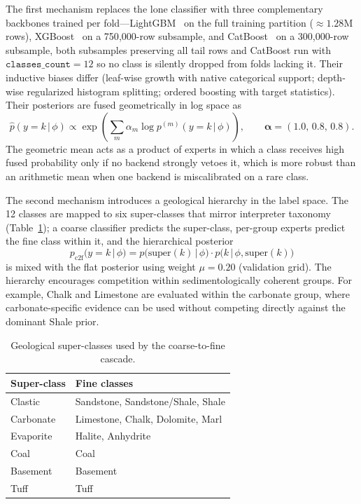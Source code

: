 \documentclass[bdcc,article,submit,pdftex,moreauthors]{Definitions/mdpi}
\begin{document}
The first mechanism replaces the lone classifier with three complementary backbones trained
per fold---LightGBM~\cite{ke2017lightgbm} on the full training partition ($\approx\!1.28$M rows),
XGBoost~\cite{chen2016xgboost} on a 750{,}000-row subsample, and
CatBoost~\cite{prokhorenkova2018catboost} on a 300{,}000-row subsample, both subsamples
preserving all tail rows and CatBoost run with $\texttt{classes\_count}=12$ so no class is
silently dropped from folds lacking it. Their inductive biases differ (leaf-wise growth with
native categorical support; depth-wise regularized histogram splitting; ordered boosting with
target statistics). Their posteriors are fused geometrically in log space as
\begin{equation}
\hat p(y=k\,|\,\phi)\propto\exp\!\left(\sum_m \alpha_m\log p^{(m)}(y=k\,|\,\phi)\right),\qquad
\boldsymbol\alpha=(1.0,\,0.8,\,0.8).
\label{eq:geomean}
\end{equation}
The geometric mean acts as a product of experts in which a class receives high fused probability only
if no backend strongly vetoes it, which is more robust than an arithmetic mean when one
backend is miscalibrated on a rare class.

The second mechanism introduces a geological hierarchy in the label space. The 12 classes are
mapped to six super-classes that mirror interpreter taxonomy (Table~\ref{tab:superclass}); a
coarse classifier predicts the super-class, per-group experts predict the fine class within it,
and the hierarchical posterior
\begin{equation}
p_\text{c2f}(y=k\,|\,\phi) = p\!\bigl(\text{super}(k)\,|\,\phi\bigr)\cdot p\!\bigl(k\,|\,\phi,\text{super}(k)\bigr)
\label{eq:c2f}
\end{equation}
is mixed with the flat posterior using weight $\mu=0.20$ (validation grid). The hierarchy
encourages competition within sedimentologically coherent groups. For example, Chalk and
Limestone are evaluated within the carbonate group, where carbonate-specific evidence can be
used without competing directly against the dominant Shale prior.

\begin{table}[H]
\caption{Geological super-classes used by the coarse-to-fine cascade.\label{tab:superclass}}
\begin{tabularx}{\textwidth}{lX}
\toprule
\textbf{Super-class} & \textbf{Fine classes}\\
\midrule
Clastic & Sandstone, Sandstone/Shale, Shale\\
Carbonate & Limestone, Chalk, Dolomite, Marl\\
Evaporite & Halite, Anhydrite\\
Coal & Coal\\
Basement & Basement\\
Tuff & Tuff\\
\bottomrule
\end{tabularx}
\end{table}
\end{document}

